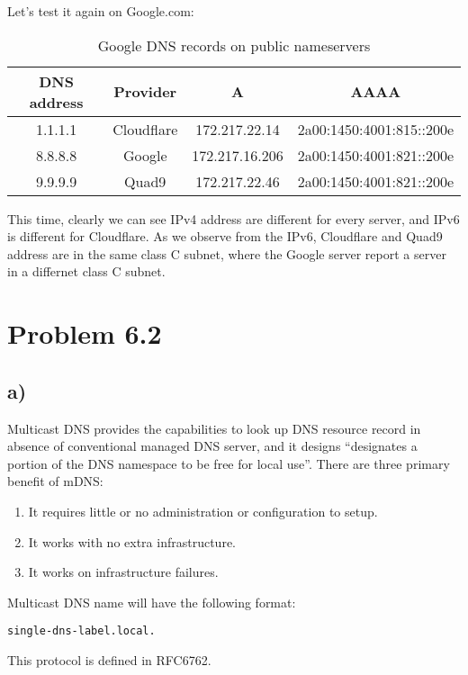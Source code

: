\documentclass{article}
\begin{document}
Let's test it again on Google.com:
\begin{table}[H]
\centering

\begin{tabular}{|c|c|c|c|}
  \hline
  DNS address & Provider & A & AAAA \\
  \hline
  1.1.1.1 & Cloudflare & 172.217.22.14 & 2a00:1450:4001:815::200e \\
  \hline
  8.8.8.8 & Google & 172.217.16.206 & 2a00:1450:4001:821::200e \\
  \hline
  9.9.9.9 & Quad9 & 172.217.22.46 & 2a00:1450:4001:821::200e \\
  \hline
\end{tabular}
\caption{Google DNS records on public nameservers}
\end{table}
This time, clearly we can see IPv4 address are different for every server, and
IPv6 is different for Cloudflare. As we observe from the IPv6, Cloudflare and
Quad9 address are in the same class C subnet, where the Google server report a
server in a differnet class C subnet.


\section*{Problem 6.2}
\subsection*{a)}
Multicast DNS provides the capabilities to look up DNS resource record in
absence of conventional managed DNS server, and it designs ``designates a portion
   of the DNS namespace to be free for local use''\autocite{RFC6762}.
There are three primary benefit of mDNS:
\begin{enumerate}
\item It requires little or no administration or configuration to setup.
\item It works with no extra infrastructure.
\item It works on infrastructure failures.
\end{enumerate}

Multicast DNS name will have the following format\autocite{RFC6762}:
\begin{verbatim}
single-dns-label.local.
\end{verbatim}

This protocol is defined in RFC6762\autocite{RFC6762}.
\end{document}
